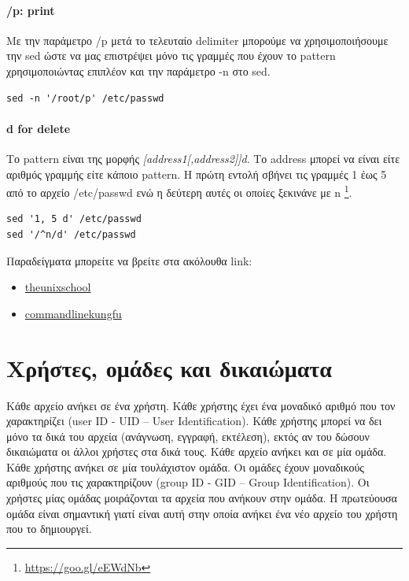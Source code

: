 \paragraph{/p: print}
Με την παράμετρο /p μετά το τελευταίο delimiter μπορούμε να χρησιμοποιήσουμε την sed ώστε να μας επιστρέψει μόνο τις γραμμές που έχουν το pattern χρησιμοποιώντας επιπλέον και την παράμετρο -n στο sed.

\begin{lstlisting}
sed -n '/root/p' /etc/passwd
\end{lstlisting} 


\paragraph{d for delete}
Το pattern είναι της μορφής \textit{[address1[,address2]]d}. Το address μπορεί να είναι είτε αριθμός γραμμής είτε κάποιο pattern. Η πρώτη εντολή σβήνει τις γραμμές 1 έως 5 από το αρχείο /etc/passwd ενώ η δεύτερη αυτές οι οποίες ξεκινάνε με n \footnote{\href{https://goo.gl/eEWdNb}{https://goo.gl/eEWdNb}}.

\begin{lstlisting}
sed '1, 5 d' /etc/passwd
sed '/^n/d' /etc/passwd 
\end{lstlisting}
 

Παραδείγματα μπορείτε να βρείτε στα ακόλουθα link:
\begin{itemize}
	\item \href{http://www.theunixschool.com/p/awk-sed.html?m=1}{theunixschool}
	\item \href{http://blog.commandlinekungfu.com/2012/12/awk-ward.html?m=1}{commandlinekungfu}
\end{itemize}


\section{Χρήστες, ομάδες και δικαιώματα}

Κάθε αρχείο ανήκει σε ένα χρήστη. Κάθε χρήστης έχει ένα μοναδικό αριθμό που τον χαρακτηρίζει (user ID - UID – User Identification). Κάθε
χρήστης μπορεί να δει μόνο τα δικά του αρχεία (ανάγνωση, εγγραφή, εκτέλεση), εκτός αν του δώσουν δικαιώματα οι άλλοι χρήστες στα δικά τους.
Κάθε αρχείο ανήκει και σε μία ομάδα. Κάθε χρήστης ανήκει σε μία τουλάχιστον ομάδα. Οι ομάδες έχουν μοναδικούς αριθμούς που τις χαρακτηρίζουν
(group ID - GID – Group Identification). Οι χρήστες μίας ομάδας μοιράζονται τα αρχεία που ανήκουν στην ομάδα. Η πρωτεύουσα ομάδα είναι
σημαντική γιατί είναι αυτή στην οποία ανήκει ένα νέο αρχείο του χρήστη που το δημιουργεί. 


